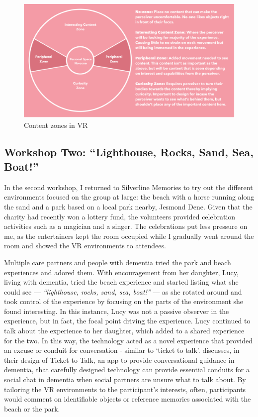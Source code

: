 \begin{figure}[htp]
\centering
\includegraphics[width=.8\linewidth]{Images/ChapterFour/ContentZones.png}
\caption{Content zones in VR}
\label{fig:ContentZone}
\end{figure}

\subsection{Workshop Two: ``Lighthouse, Rocks, Sand, Sea, Boat!''}
\label{StudyOne:WorkshopTwo}
In the second workshop, I returned to Silverline Memories to try out the different environments focused on the group at large: the beach with a horse running along the sand and a park based on a local park nearby, Jesmond Dene. Given that the charity had recently won a lottery fund, the volunteers provided celebration activities such as a magician and a singer. The celebrations put less pressure on me, as the entertainers kept the room occupied while I gradually went around the room and showed the VR environments to attendees. 

Multiple care partners and people with dementia tried the park and beach experiences and adored them. With encouragement from her daughter, Lucy, living with dementia, tried the beach experience and started listing what she could see — \textit{``lighthouse, rocks, sand, sea, boat!''} — as she rotated around and took control of the experience by focusing on the parts of the environment she found interesting. In this instance, Lucy was not a passive observer in the experience, but in fact, the focal point driving the experience. Lucy continued to talk about the experience to her daughter, which added to a shared experience for the two. In this way, the technology acted as a novel experience that provided an excuse or conduit for conversation - similar to `ticket to talk'. \cite{welsh_ticket_2018} discusses, in their design of Ticket to Talk, an app to provide conversational guidance in dementia, that carefully designed technology can provide essential conduits for a social chat in dementia when social partners are unsure what to talk about. By tailoring the VR environments to the participant's interests, often, participants would comment on identifiable objects or reference memories associated with the beach or the park.

